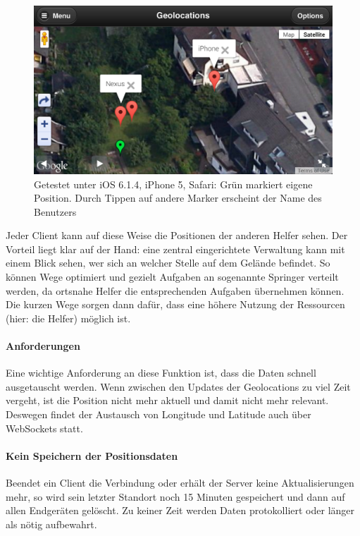 \begin{figure}[!ht]
	\centering
	\includegraphics[width=15cm]{fig/screenshot_geolocations}
	\caption[Beispielansicht der Geolocations]{Getestet unter iOS 6.1.4, iPhone 5, Safari: Grün markiert eigene Position. Durch Tippen auf andere Marker erscheint der Name des Benutzers}
\end{figure}

Jeder Client kann auf diese Weise die Positionen der anderen Helfer sehen. Der Vorteil liegt klar auf der Hand: eine zentral eingerichtete Verwaltung kann mit einem Blick sehen, wer sich an welcher Stelle auf dem Gelände befindet. So können Wege optimiert und gezielt Aufgaben an sogenannte Springer verteilt werden, da ortsnahe Helfer die entsprechenden Aufgaben übernehmen können. Die kurzen Wege sorgen dann dafür, dass eine höhere Nutzung der Ressourcen (hier: die Helfer) möglich ist.\par

\paragraph{Anforderungen}
Eine wichtige Anforderung an diese Funktion ist, dass die Daten schnell ausgetauscht werden. Wenn zwischen den Updates der Geolocations zu viel Zeit vergeht, ist die Position nicht mehr aktuell und damit nicht mehr relevant. Deswegen findet der Austausch von Longitude und Latitude auch über WebSockets statt.

\paragraph{Kein Speichern der Positionsdaten}
Beendet ein Client die Verbindung oder erhält der Server keine Aktualisierungen mehr, so wird sein letzter Standort noch 15 Minuten gespeichert und dann auf allen Endgeräten gelöscht. Zu keiner Zeit werden Daten protokolliert oder länger als nötig aufbewahrt.

